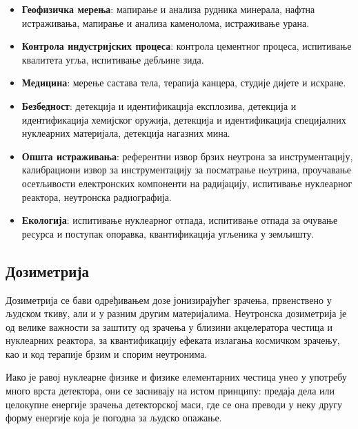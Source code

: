 \documentclass[12pt,a4paper,serbian,oneside]{book}
\begin{document}
\begin{itemize}
  
  \item \textbf{Геофизичка мерења}: мапирање и анализа рудника минерала, нафтна истраживања, мапирање и анализа каменолома, истраживање урана.

  \item \textbf{Контрола индустријских процеса}: контрола цементног процеса, испитивање квалитета угља, испитивање дебљине зида.

  \item \textbf{Медицина}: мерење састава тела, терапија канцера, студије дијете и исхране.

  \item \textbf{Безбедност}: детекција и идентификација експлозива, детекција и идентификација хемијског оружија, детекција и идентификација специјалних нуклеарних материјала, детекција нагазних мина.

  \item \textbf{Општа истраживања}: референтни извор брзих неутрона за инструментацију, калибрациони извор за инструментацију за посматрање нeутрина, проучавање осетљивости електронских компоненти на радијацију, испитивање нуклеарног реактора, неутронска радиографија.

  \item \textbf{Екологија}: испитивање нуклеарног отпада, испитивање отпада за очување ресурса и поступак опоравка, квантификација угљеника у земљишту.

\end{itemize}

\subsection{Дозиметрија}

Дозиметрија \cite{bmilenkovic} се бави одређивањем дозе јонизирајућег зрачења, првенствено у људском ткиву, али и у разним другим материјалима. Неутронска дозиметрија је од велике важности за заштиту од зрачења у близини акцелератора честица и нуклеарних реактора, за квантификацију ефеката излагања космичком зрачењу, као и код терапије брзим и спорим неутронима.

Иако је равој нуклеарне физике и физике елементарних честица унео у употребу много врста детектора, они се заснивају на истом принципу: предаја дела или целокупне енергије зрачења детекторској маси, где се она преводи у неку другу форму енергије која је погодна за људско опажање.
\end{document}
